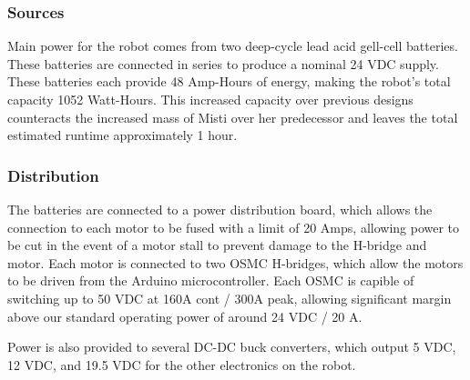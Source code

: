 \subsubsection{Sources}
Main power for the robot comes from two deep-cycle lead acid gell-cell batteries. These batteries are
 connected in series to produce a nominal 24 VDC supply. These batteries each provide 48 Amp-Hours of energy, making the robot's total capacity 1052 Watt-Hours. This increased capacity over previous designs counteracts the increased mass of Misti over her predecessor and leaves the total estimated runtime approximately 1 hour.

\subsubsection{Distribution}
The batteries are connected to a power distribution board, which allows the connection to each
motor to be fused with a limit of 20 Amps, allowing power to be cut in the event of a motor stall 
to prevent damage to the H-bridge and motor. Each motor is connected to two OSMC H-bridges, which allow the motors to be driven from the Arduino microcontroller. Each OSMC is capible of switching up to 50 VDC at 160A cont / 300A peak, allowing significant margin above our standard operating power of around 24 VDC / 20 A. 

Power is also provided to several DC-DC buck converters, which output 5 VDC, 12 VDC, and 19.5 VDC for the other electronics on the robot.

